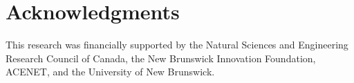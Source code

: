 \documentclass[11pt]{article}
\begin{document}








\section*{Acknowledgments}

This research was financially supported by the Natural Sciences and
Engineering Research Council of Canada, the New Brunswick Innovation
Foundation, ACENET, and the University of New Brunswick.


%



\end{document}
